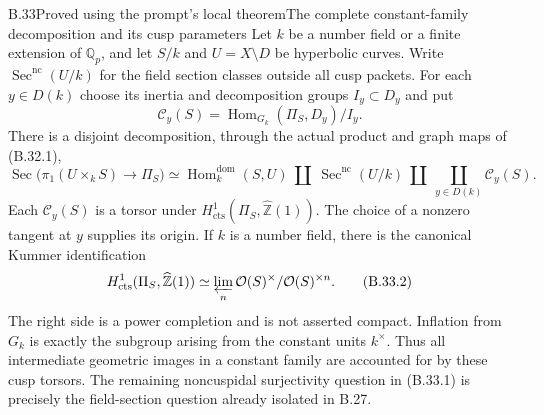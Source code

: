 \begin{statement}{B.33}{Proved using the prompt's local theorem}{The complete constant-family decomposition and its cusp parameters}
Let $k$ be a number field or a finite extension of
$\mathbb Q_p$, and let $S/k$ and $U=X\setminus D$ be
hyperbolic curves. Write
$\operatorname{Sec}^{\mathrm{nc}}(U/k)$ for the field
section classes outside all cusp packets.
For each $y\in D(k)$ choose its inertia and decomposition
groups $I_y\subset D_y$ and put
\[
 \mathcal C_y(S)=
 \operatorname{Hom}_{G_k}(\Pi_S,D_y)/I_y.
\]
There is a disjoint decomposition, through the actual
product and graph maps of (B.32.1),
\[
 \operatorname{Sec}\bigl(\pi_1(U\times_k S)\to\Pi_S\bigr)
 \simeq
 \operatorname{Hom}^{\mathrm{dom}}_k(S,U)
 \ \amalg\
 \operatorname{Sec}^{\mathrm{nc}}(U/k)
 \ \amalg\
 \coprod_{y\in D(k)}\mathcal C_y(S).
\tag{B.33.1}
\]
Each $\mathcal C_y(S)$ is a torsor under
$H^1_{\mathrm{cts}}(\Pi_S,\widehat{\mathbb Z}(1))$.
The choice of a nonzero tangent at $y$ supplies its
origin. If $k$ is a number field, there is the canonical
Kummer identification
\[
 H^1_{\mathrm{cts}}(\Pi_S,\widehat{\mathbb Z}(1))
 \simeq
 \varprojlim_n
  \mathcal O(S)^\times/
                      \mathcal O(S)^{\times n}.
\tag{B.33.2}
\]
The right side is a power completion and is not
asserted compact. Inflation from $G_k$ is exactly
the subgroup arising from the constant units
$k^\times$. Thus all intermediate geometric images
in a constant family are accounted for by these
cusp torsors. The remaining noncuspidal
surjectivity question in (B.33.1) is precisely the
field-section question already isolated in B.27.
\end{statement}
